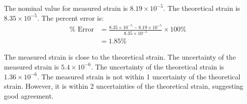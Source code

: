 \section{}

The nominal value for measured strain is $8.19 \times 10^{-5}$. The theoretical strain is $8.35 \times 10^{-5}$. The percent error is:
\begin{align*}
    \% \text{ Error} &= \frac{8.35 \times 10^{-5} - 8.19 \times 10^{-5}}{8.35 \times 10^{-5}} \times 100\% \\
    &= \boxed{1.85\%}
\end{align*}

The measured strain is close to the theoretical strain. The uncertainty of the measured strain is $5.4 \times 10^{-6}$. The uncertainty of 
the theoretical strain is $1.36 \times 10^{-6}$. The measured strain is not within 1 uncertainty of the theoretical strain. However, it is within 2 uncertainties of 
the theoretical strain, suggesting good agreement.